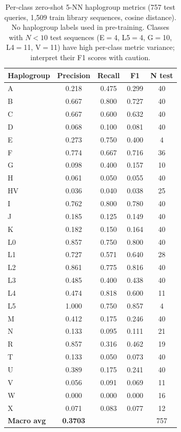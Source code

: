 \documentclass[10pt]{article}
\begin{document}
\begin{table}[h]
\centering
\caption{Per-class zero-shot 5-NN haplogroup metrics (757 test queries, 1,509 train
library sequences, cosine distance). No haplogroup labels used in pre-training.
Classes with $N<10$ test sequences (E$=$4, L5$=$4, G$=$10, L4$=$11, V$=$11) have
high per-class metric variance; interpret their F1 scores with caution.}
\begin{tabular}{lcccc}
\toprule
\textbf{Haplogroup} & \textbf{Precision} & \textbf{Recall} & \textbf{F1} & \textbf{N test} \\
\midrule
A & 0.218 & 0.475 & 0.299 & 40 \\
B & 0.667 & 0.800 & 0.727 & 40 \\
C & 0.667 & 0.600 & 0.632 & 40 \\
D & 0.068 & 0.100 & 0.081 & 40 \\
E & 0.273 & 0.750 & 0.400 & 4 \\
F & 0.774 & 0.667 & 0.716 & 36 \\
G & 0.098 & 0.400 & 0.157 & 10 \\
H & 0.061 & 0.050 & 0.055 & 40 \\
HV & 0.036 & 0.040 & 0.038 & 25 \\
I & 0.762 & 0.800 & 0.780 & 40 \\
J & 0.185 & 0.125 & 0.149 & 40 \\
K & 0.182 & 0.150 & 0.164 & 40 \\
L0 & 0.857 & 0.750 & 0.800 & 40 \\
L1 & 0.727 & 0.571 & 0.640 & 28 \\
L2 & 0.861 & 0.775 & 0.816 & 40 \\
L3 & 0.485 & 0.400 & 0.438 & 40 \\
L4 & 0.474 & 0.818 & 0.600 & 11 \\
L5 & 1.000 & 0.750 & 0.857 & 4 \\
M & 0.412 & 0.175 & 0.246 & 40 \\
N & 0.133 & 0.095 & 0.111 & 21 \\
R & 0.857 & 0.316 & 0.462 & 19 \\
T & 0.133 & 0.050 & 0.073 & 40 \\
U & 0.389 & 0.175 & 0.241 & 40 \\
V & 0.056 & 0.091 & 0.069 & 11 \\
W & 0.000 & 0.000 & 0.000 & 16 \\
X & 0.071 & 0.083 & 0.077 & 12 \\
\midrule
\textbf{Macro avg} & \textbf{0.3703} & & & 757 \\
\bottomrule
\end{tabular}
\label{tab:per_class_zeroshot}
\end{table}
\end{document}
